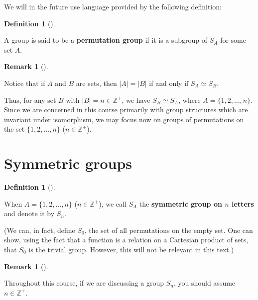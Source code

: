 \documentclass[10pt,]{book}
\newcommand{\terminology}[1]{\textbf{#1}}
\theoremstyle{plain}
\theoremstyle{definition}
\newtheorem{definition}[theorem]{Definition}
\theoremstyle{definition}
\newtheorem{remark}[theorem]{Remark}
\theoremstyle{definition}
\theoremstyle{definition}
\numberwithin{equation}{section}
\def\Z{\mathbb{Z}}
\begin{document}
    We will in the future use language provided by the following
    definition:
\begin{definition}[{}]\label{definition-43}

        A group is said to be a \terminology{permutation group} if it is
        a subgroup of \(S_A\) for some set \(A\).
\end{definition}
\begin{remark}[]\label{remark-25}

      Notice
      that if \(A\) and \(B\) are sets, then \(|A|=|B|\) if and only if
      \(S_A\simeq S_B\).
\end{remark}
\par

    Thus, for any set \(B\) with \(|B|=n \in \Z^+\), we have \(S_B\simeq
    S_A\), where \(A=\{1,2,\ldots,n\}\). Since we are concerned in this
    course primarily with group structures which are invariant under
    isomorphism, we may focus now on groups of permutations on the set
    \(\{1,2,\ldots, n\}\) (\(n\in \Z^+\)).%
\typeout{************************************************}
\typeout{************************************************}
\section[{Symmetric groups}]{Symmetric groups}\label{section-18}
\begin{definition}[{}]\label{definition-44}

        When \(A=\{1,2,\ldots, n\}\) (\(n\in \Z^+\)), we call \(S_A\)
        the \terminology{symmetric group on \(n\) letters} and denote it by
        \(S_n\).
\par
    (We can, in fact,  define \(S_0\), the set of all permutations on the empty set. One can show, using the fact that a function is a relation on a Cartesian product of sets, that \(S_0\) is the trivial group. However, this will not be relevant in this text.)%
\label{notation-56}
\end{definition}
\begin{remark}[]\label{remark-26}

      Throughout this course, if we are discussing a
      group \(S_n\), you should assume \(n\in \Z^+\).
\end{remark}
\end{document}
